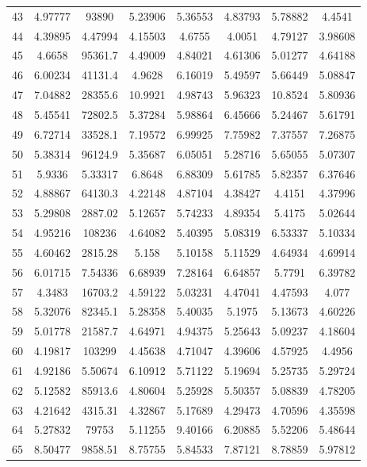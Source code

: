 \begin{center}
\begin{longtable}{cccccccc}
43 & 4.97777 & 93890 & 5.23906 & 5.36553 & 4.83793 & 5.78882 & 4.4541\\
44 & 4.39895 & 4.47994 & 4.15503 & 4.6755 & 4.0051 & 4.79127 & 3.98608\\
45 & 4.6658 & 95361.7 & 4.49009 & 4.84021 & 4.61306 & 5.01277 & 4.64188\\
46 & 6.00234 & 41131.4 & 4.9628 & 6.16019 & 5.49597 & 5.66449 & 5.08847\\
47 & 7.04882 & 28355.6 & 10.9921 & 4.98743 & 5.96323 & 10.8524 & 5.80936\\
48 & 5.45541 & 72802.5 & 5.37284 & 5.98864 & 6.45666 & 5.24467 & 5.61791\\
49 & 6.72714 & 33528.1 & 7.19572 & 6.99925 & 7.75982 & 7.37557 & 7.26875\\
50 & 5.38314 & 96124.9 & 5.35687 & 6.05051 & 5.28716 & 5.65055 & 5.07307\\
51 & 5.9336 & 5.33317 & 6.8648 & 6.88309 & 5.61785 & 5.82357 & 6.37646\\
52 & 4.88867 & 64130.3 & 4.22148 & 4.87104 & 4.38427 & 4.4151 & 4.37996\\
53 & 5.29808 & 2887.02 & 5.12657 & 5.74233 & 4.89354 & 5.4175 & 5.02644\\
54 & 4.95216 & 108236 & 4.64082 & 5.40395 & 5.08319 & 6.53337 & 5.10334\\
55 & 4.60462 & 2815.28 & 5.158 & 5.10158 & 5.11529 & 4.64934 & 4.69914\\
56 & 6.01715 & 7.54336 & 6.68939 & 7.28164 & 6.64857 & 5.7791 & 6.39782\\
57 & 4.3483 & 16703.2 & 4.59122 & 5.03231 & 4.47041 & 4.47593 & 4.077\\
58 & 5.32076 & 82345.1 & 5.28358 & 5.40035 & 5.1975 & 5.13673 & 4.60226\\
59 & 5.01778 & 21587.7 & 4.64971 & 4.94375 & 5.25643 & 5.09237 & 4.18604\\
60 & 4.19817 & 103299 & 4.45638 & 4.71047 & 4.39606 & 4.57925 & 4.4956\\
61 & 4.92186 & 5.50674 & 6.10912 & 5.71122 & 5.19694 & 5.25735 & 5.29724\\
62 & 5.12582 & 85913.6 & 4.80604 & 5.25928 & 5.50357 & 5.08839 & 4.78205\\
63 & 4.21642 & 4315.31 & 4.32867 & 5.17689 & 4.29473 & 4.70596 & 4.35598\\
64 & 5.27832 & 79753 & 5.11255 & 9.40166 & 6.20885 & 5.52206 & 5.48644\\
65 & 8.50477 & 9858.51 & 8.75755 & 5.84533 & 7.87121 & 8.78859 & 5.97812\\

\end{longtable}
\end{center}
